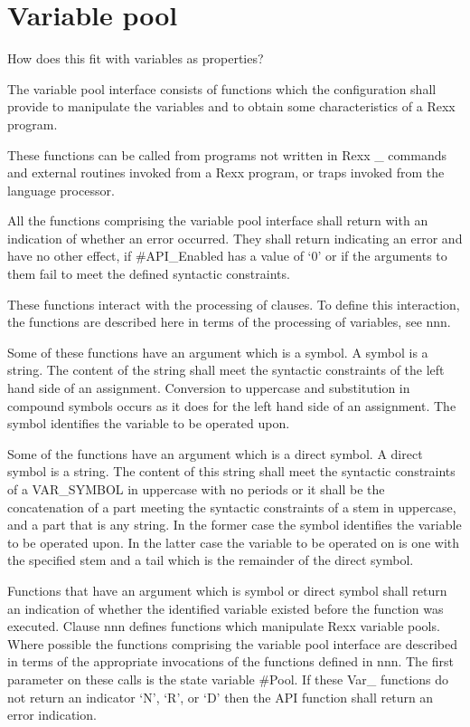 \hypertarget{variable-pool}{%
\section{Variable pool}\label{variable-pool}}

How does this fit with variables as properties?

The variable pool interface consists of functions which the
configuration shall provide to manipulate the variables and to obtain
some characteristics of a Rexx program.

These functions can be called from programs not written in Rexx \_
commands and external routines invoked from a Rexx program, or traps
invoked from the language processor.

All the functions comprising the variable pool interface shall return
with an indication of whether an error occurred. They shall return
indicating an error and have no other effect, if \#API\_Enabled has a
value of `0' or if the arguments to them fail to meet the defined
syntactic constraints.

These functions interact with the processing of clauses. To define this
interaction, the functions are described here in terms of the processing
of variables, see nnn.

Some of these functions have an argument which is a symbol. A symbol is
a string. The content of the string shall meet the syntactic constraints
of the left hand side of an assignment. Conversion to uppercase and
substitution in compound symbols occurs as it does for the left hand
side of an assignment. The symbol identifies the variable to be operated
upon.

Some of the functions have an argument which is a direct symbol. A
direct symbol is a string. The content of this string shall meet the
syntactic constraints of a VAR\_SYMBOL in uppercase with no periods or
it shall be the concatenation of a part meeting the syntactic
constraints of a stem in uppercase, and a part that is any string. In
the former case the symbol identifies the variable to be operated upon.
In the latter case the variable to be operated on is one with the
specified stem and a tail which is the remainder of the direct symbol.

Functions that have an argument which is symbol or direct symbol shall
return an indication of whether the identified variable existed before
the function was executed. Clause nnn defines functions which manipulate
Rexx variable pools. Where possible the functions comprising the
variable pool interface are described in terms of the appropriate
invocations of the functions defined in nnn. The first parameter on
these calls is the state variable \#Pool. If these Var\_ functions do
not return an indicator `N', `R', or `D' then the API function shall
return an error indication.

